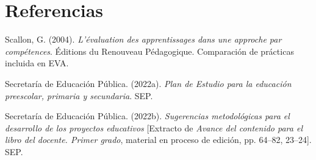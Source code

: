 \documentclass[spanish,letterpaper,oneside]{article}
\begin{document}
\section*{Referencias}
{\setlength{\parskip}{6pt}
\par\hangindent=1.27cm  Scallon, G. (2004). \textit{L’évaluation des apprentissages dans une approche par compétences}. Éditions du Renouveau Pédagogique. Comparación de prácticas incluida en EVA.
\par\hangindent=1.27cm  Secretaría de Educación Pública. (2022a). \textit{Plan de Estudio para la educación preescolar, primaria y secundaria}. SEP.
\par\hangindent=1.27cm  Secretaría de Educación Pública. (2022b). \textit{Sugerencias metodológicas para el desarrollo de los proyectos educativos} [Extracto de \textit{Avance del contenido para el libro del docente. Primer grado}, material en proceso de edición, pp. 64--82, 23--24]. SEP.
}
\end{document}
